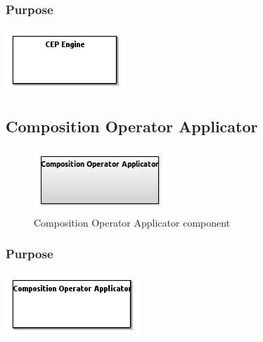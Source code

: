 \documentclass{gemoc} %
\begin{document}
\subsubsection{Purpose}

\begin{center}
\includegraphics*[trim=0.0cm 0.0cm 0cm 0.0cm, clip=true]{../images/generated/Generated_CEP_Engine.png}
\end{center}



\subsection{Composition Operator Applicator}

\begin{figure}[htp]
	\begin{center}
	\includegraphics*[trim=0.0cm 0.0cm 0cm 0.0cm, clip=true, scale=1.0]{../images/generated/Generated_Composition Operator Applicator.jpg}
	\caption{Composition Operator Applicator component}
	\end{center}
\end{figure}

\subsubsection{Purpose}

\begin{center}
\includegraphics*[trim=0.0cm 0.0cm 0cm 0.0cm, clip=true]{../images/generated/Generated_Composition_Operator_Applicator.png}
\end{center}
\end{document}
